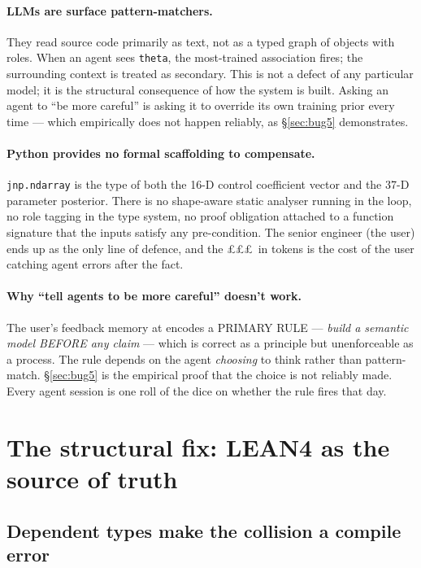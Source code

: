 \documentclass[11pt,a4paper]{article}
\begin{document}
\paragraph{LLMs are surface pattern-matchers.} They read source
code primarily as text, not as a typed graph of objects with
roles. When an agent sees \texttt{theta}, the most-trained
association fires; the surrounding context is treated as
secondary. This is not a defect of any particular model; it is the
structural consequence of how the system is built. Asking an agent
to ``be more careful'' is asking it to override its own training
prior every time --- which empirically does not happen reliably,
as §\ref{sec:bug5} demonstrates.

\paragraph{Python provides no formal scaffolding to compensate.}
\texttt{jnp.ndarray} is the type of both the 16-D control
coefficient vector and the 37-D parameter posterior. There is no
shape-aware static analyser running in the loop, no role tagging
in the type system, no proof obligation attached to a function
signature that the inputs satisfy any pre-condition. The senior
engineer (the user) ends up as the only line of defence, and the
\pounds\pounds\pounds\ in tokens is the cost of the user catching agent errors after
the fact.

\paragraph{Why ``tell agents to be more careful'' doesn't work.}
The user's feedback memory at 
encodes a PRIMARY RULE --- \emph{build a semantic model BEFORE any
claim} --- which is correct as a principle but unenforceable as a
process. The rule depends on the agent \emph{choosing} to think
rather than pattern-match. §\ref{sec:bug5} is the empirical proof
that the choice is not reliably made. Every agent session is one
roll of the dice on whether the rule fires that day.

\section{The structural fix: LEAN4 as the source of truth}
\label{sec:fix}

\subsection{Dependent types make the collision a compile error}
\end{document}
